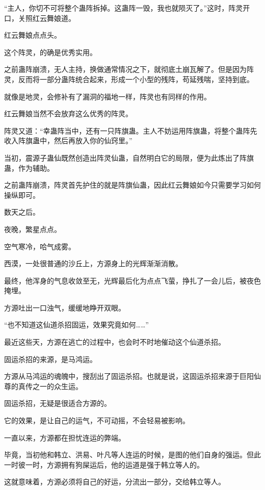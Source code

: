 
\begin{this_body}

“主人，你切不可将整个蛊阵拆掉。这蛊阵一毁，我也就陨灭了。”这时，阵灵开口，关照红云舞娘道。

红云舞娘点点头。

这个阵灵，的确是优秀实用。

之前蛊阵崩溃，无人主持，换做通常情况之下，就彻底土崩瓦解了。但是因为阵灵，反而将一部分蛊阵统合起来，形成一个小型的残阵，苟延残喘，坚持到底。

就像是地灵，会修补有了漏洞的福地一样，阵灵也有同样的作用。

红云舞娘当然不会放弃这么优秀的阵灵。

阵灵又道：“幸蛊阵当中，还有一只阵旗蛊。主人不妨运用阵旗蛊，将整个蛊阵先收入阵旗蛊中，然后再放入你的仙窍里。”

当初，震源子蛊仙既然创造出阵灵仙蛊，自然明白它的局限，便为此炼出了阵旗蛊，作为辅助。

之前蛊阵崩溃，阵灵首先护住的就是阵旗仙蛊，因此红云舞娘如今只需要学习如何操纵即可。

数天之后。

夜晚，繁星点点。

空气寒冷，哈气成雾。

西漠，一处很普通的沙丘上，方源身上的光辉渐渐消散。

最终，他浑身的气息收敛至无，光辉最后化为点点飞萤，挣扎了一会儿后，被夜色掩埋。

方源吐出一口浊气，缓缓地睁开双眼。

“也不知道这仙道杀招固运，效果究竟如何……”

最近这些天，方源在逃亡的过程中，也会时不时地催动这个仙道杀招。

固运杀招的来源，是马鸿运。

方源从马鸿运的魂魄中，搜刮出了固运杀招。也就是说，这固运杀招来源于巨阳仙尊的真传之一的众生运。

固运杀招，无疑是很适合方源的。

它的效果，是让自己的运气，不可动摇，不会轻易被影响。

一直以来，方源都在担忧连运的弊端。

毕竟，当初他和韩立、洪易、叶凡等人连运的时候，是图的他们自身的强运。但此一时彼一时，方源拥有狗屎运后，他的运道是强于韩立等人的。

这就意味着，方源必须将自己的好运，分流出一部分，交给韩立等人。


\end{this_body}
